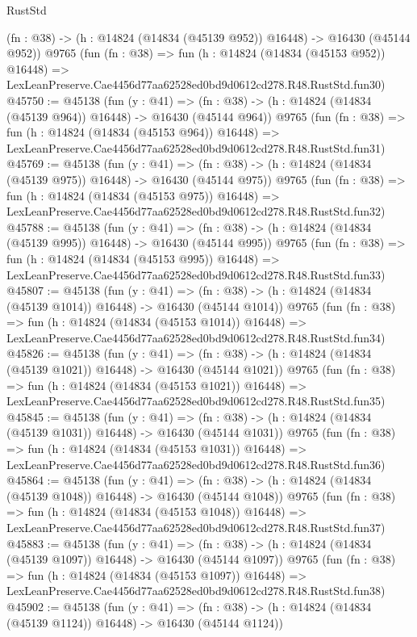 \begin{lexlean}{RustStd}
\begin{coremodule}
    (fn : @38) -> (h : @14824 (@14834 (@45139 @952)) @16448) -> @16430 (@45144 @952))
    @9765
    (fun (fn : @38) =>
    fun (h : @14824 (@14834 (@45153 @952)) @16448) =>
    LexLeanPreserve.Cae4456d77aa62528ed0bd9d0612cd278.R48.RustStd.fun30)
@45750 := @45138
    (fun (y : @41) =>
    (fn : @38) -> (h : @14824 (@14834 (@45139 @964)) @16448) -> @16430 (@45144 @964))
    @9765
    (fun (fn : @38) =>
    fun (h : @14824 (@14834 (@45153 @964)) @16448) =>
    LexLeanPreserve.Cae4456d77aa62528ed0bd9d0612cd278.R48.RustStd.fun31)
@45769 := @45138
    (fun (y : @41) =>
    (fn : @38) -> (h : @14824 (@14834 (@45139 @975)) @16448) -> @16430 (@45144 @975))
    @9765
    (fun (fn : @38) =>
    fun (h : @14824 (@14834 (@45153 @975)) @16448) =>
    LexLeanPreserve.Cae4456d77aa62528ed0bd9d0612cd278.R48.RustStd.fun32)
@45788 := @45138
    (fun (y : @41) =>
    (fn : @38) -> (h : @14824 (@14834 (@45139 @995)) @16448) -> @16430 (@45144 @995))
    @9765
    (fun (fn : @38) =>
    fun (h : @14824 (@14834 (@45153 @995)) @16448) =>
    LexLeanPreserve.Cae4456d77aa62528ed0bd9d0612cd278.R48.RustStd.fun33)
@45807 := @45138
    (fun (y : @41) =>
    (fn : @38) -> (h : @14824 (@14834 (@45139 @1014)) @16448) -> @16430 (@45144 @1014))
    @9765
    (fun (fn : @38) =>
    fun (h : @14824 (@14834 (@45153 @1014)) @16448) =>
    LexLeanPreserve.Cae4456d77aa62528ed0bd9d0612cd278.R48.RustStd.fun34)
@45826 := @45138
    (fun (y : @41) =>
    (fn : @38) -> (h : @14824 (@14834 (@45139 @1021)) @16448) -> @16430 (@45144 @1021))
    @9765
    (fun (fn : @38) =>
    fun (h : @14824 (@14834 (@45153 @1021)) @16448) =>
    LexLeanPreserve.Cae4456d77aa62528ed0bd9d0612cd278.R48.RustStd.fun35)
@45845 := @45138
    (fun (y : @41) =>
    (fn : @38) -> (h : @14824 (@14834 (@45139 @1031)) @16448) -> @16430 (@45144 @1031))
    @9765
    (fun (fn : @38) =>
    fun (h : @14824 (@14834 (@45153 @1031)) @16448) =>
    LexLeanPreserve.Cae4456d77aa62528ed0bd9d0612cd278.R48.RustStd.fun36)
@45864 := @45138
    (fun (y : @41) =>
    (fn : @38) -> (h : @14824 (@14834 (@45139 @1048)) @16448) -> @16430 (@45144 @1048))
    @9765
    (fun (fn : @38) =>
    fun (h : @14824 (@14834 (@45153 @1048)) @16448) =>
    LexLeanPreserve.Cae4456d77aa62528ed0bd9d0612cd278.R48.RustStd.fun37)
@45883 := @45138
    (fun (y : @41) =>
    (fn : @38) -> (h : @14824 (@14834 (@45139 @1097)) @16448) -> @16430 (@45144 @1097))
    @9765
    (fun (fn : @38) =>
    fun (h : @14824 (@14834 (@45153 @1097)) @16448) =>
    LexLeanPreserve.Cae4456d77aa62528ed0bd9d0612cd278.R48.RustStd.fun38)
@45902 := @45138
    (fun (y : @41) =>
    (fn : @38) -> (h : @14824 (@14834 (@45139 @1124)) @16448) -> @16430 (@45144 @1124))

\end{coremodule}
\end{lexlean}
